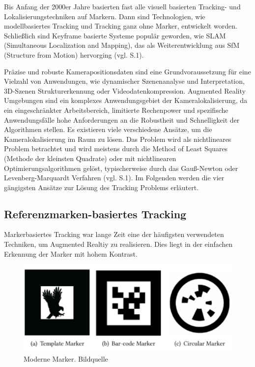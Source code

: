 Bis Anfang der 2000er Jahre basierten fast alle visuell basierten Tracking- und Lokalisierungstechniken auf Markern. Dann sind Technologien, wie modellbasiertes Tracking und Tracking ganz ohne Marker, entwickelt worden. Schließlich sind Keyframe basierte Systeme populär geworden, wie SLAM (Simultaneous Localization and Mapping), das als Weiterentwicklung aus SfM (Structure from Motion) hervorging (vgl. \cite{pose_estimation} S.1).

Präzise und robuste Kamerapositionsdaten sind eine Grundvoraussetzung für eine Vielzahl von Anwendungen, wie dynamischer Szenenanalyse und Interpretation, 3D-Szenen Strukturerkennung oder Videodatenkompression. Augmented Reality Umgebungen sind ein komplexes Anwendungsgebiet der Kameralokalisierung, da ein eingeschränkter Arbeitsbereich, limitierte Rechenpower und spezifische Anwendungsfälle hohe Anforderungen an die Robustheit und Schnelligkeit der Algorithmen stellen. 
Es existieren viele verschiedene Ansätze, um die Kameralokalisierung im Raum zu lösen. Das Problem wird als nichtlineares Problem betrachtet und wird meistens durch die \glqq Method of Least Squares\grqq{} (Methode der kleinsten Quadrate) oder  mit nichtlinearen Optimierungsalgorithmen gelöst, typischerweise durch das Gauß-Newton oder Levenberg-Marquardt Verfahren (vgl. \cite{camera_pose} S.1). Im Folgenden werden die vier gängigsten Ansätze zur Lösung des Tracking Problems erläutert. 


\subsection{Referenzmarken-basiertes Tracking}

Markerbasiertes Tracking war lange Zeit eine der häufigsten verwendeten Techniken, um Augmented Realtiy zu realisieren. Dies liegt in der einfachen Erkennung der Marker mit hohem Kontrast.

\begin{figure}[H]
	\centering
	\includegraphics[scale=0.6]{markers.png}
	\caption{Moderne Marker. Bildquelle \cite{markers}}
\end{figure} 

